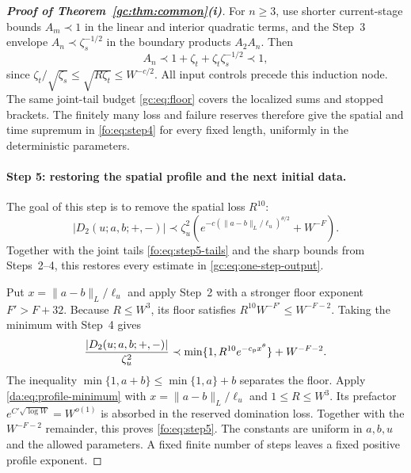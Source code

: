 \documentclass[11pt]{article}
\numberwithin{equation}{section}
\theoremstyle{remark}
\begin{document}
\begin{proof}[\textbf{Proof of Theorem~\ref{gc:thm:common}(i)}]
For $n\ge3$, use shorter current-stage bounds $A_m\prec1$ in the
linear and interior quadratic terms, and the Step~3 envelope
$A_n\prec\zeta_s^{-1/2}$ in the boundary products $A_2A_n$. Then
\[
 A_n\prec1+\zeta_t+\zeta_t\zeta_s^{-1/2}\prec1,
\]
since $\zeta_t/\sqrt{\zeta_s}\le\sqrt{R\zeta_t}\le W^{-c/2}$.
All input controls precede this induction node.
The same joint-tail budget \eqref{gc:eq:floor} covers the localized
sums and stopped brackets. The finitely many loss and failure reserves
therefore give the spatial and time supremum in \eqref{fo:eq:step4}
for every fixed length, uniformly in the deterministic parameters.

\paragraph{Step 5: restoring the spatial profile and the next initial data.}
The goal of this step is to remove the spatial loss $R^{10}$:
\begin{equation}\label{fo:eq:step5}
 |D_2(u;a,b;+,-)|\prec\zeta_u^2
 \left(e^{-c(\|a-b\|_L/\ell_u)^{\theta/2}}+W^{-F}\right).
\end{equation}
Together with the joint tails \eqref{fo:eq:step5-tails} and the sharp
bounds from Steps~2--4, this restores every estimate in
\eqref{gc:eq:one-step-output}.

Put $x=\|a-b\|_L/\ell_u$ and apply Step~2 with a stronger floor
exponent $F'>F+32$. Because $R\le W^3$, its floor satisfies
$R^{10}W^{-F'}\le W^{-F-2}$. Taking the minimum with Step~4 gives
\[
 \frac{|D_2(u;a,b;+,-)|}{\zeta_u^2}
 \prec\min\{1,R^{10}e^{-c_{\rm p}x^\theta}\}+W^{-F-2}.
\]
The inequality $\min\{1,a+b\}\le\min\{1,a\}+b$ separates the floor.
Apply \eqref{da:eq:profile-minimum} with
$x=\|a-b\|_L/\ell_u$ and $1\le R\le W^3$.
Its prefactor $e^{C'\sqrt{\log W}}=W^{o(1)}$ is absorbed
in the reserved domination loss. Together with the
$W^{-F-2}$ remainder, this proves \eqref{fo:eq:step5}.
The constants are uniform in $a,b,u$ and the allowed parameters.
A fixed finite number of steps leaves a fixed positive profile exponent.


\end{proof}
\end{document}

